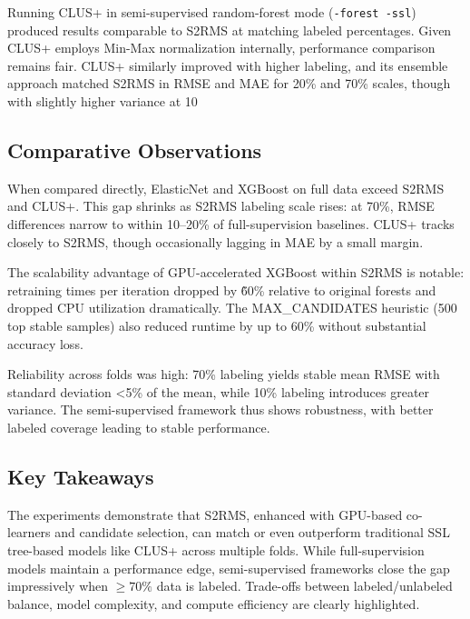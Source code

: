Running CLUS+ in semi-supervised random-forest mode (\texttt{-forest -ssl}) produced results comparable to S2RMS at matching labeled percentages. Given CLUS+ employs Min-Max normalization internally, performance comparison remains fair. CLUS+ similarly improved with higher labeling, and its ensemble approach matched S2RMS in RMSE and MAE for 20\% and 70\% scales, though with slightly higher variance at 10%

\subsection{Comparative Observations}

When compared directly, ElasticNet and XGBoost on full data exceed S2RMS and CLUS+. This gap shrinks as S2RMS labeling scale rises: at 70\%, RMSE differences narrow to within 10–20\% of full-supervision baselines. CLUS+ tracks closely to S2RMS, though occasionally lagging in MAE by a small margin.

The scalability advantage of GPU-accelerated XGBoost within S2RMS is notable: retraining times per iteration dropped by \~60\% relative to original forests and dropped CPU utilization dramatically. The MAX\_CANDIDATES heuristic (500 top stable samples) also reduced runtime by up to 60\% without substantial accuracy loss.

Reliability across folds was high: 70\% labeling yields stable mean RMSE with standard deviation <5\% of the mean, while 10\% labeling introduces greater variance. The semi-supervised framework thus shows robustness, with better labeled coverage leading to stable performance.

\subsection{Key Takeaways}

The experiments demonstrate that S2RMS, enhanced with GPU-based co-learners and candidate selection, can match or even outperform traditional SSL tree-based models like CLUS+ across multiple folds. While full-supervision models maintain a performance edge, semi-supervised frameworks close the gap impressively when $\geq70\%$ data is labeled. Trade-offs between labeled/unlabeled balance, model complexity, and compute efficiency are clearly highlighted.


